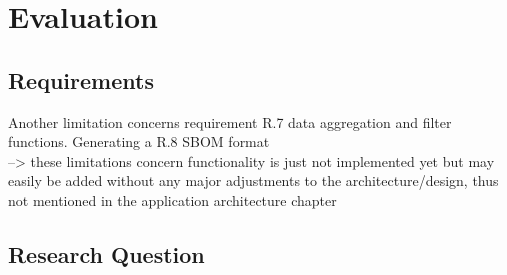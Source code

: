 

\section{Evaluation}
\subsection{Requirements}
Another limitation concerns requirement R.7 data aggregation and filter functions.
Generating a R.8 SBOM format\\
--> these limitations concern functionality is just not implemented yet but may easily be added without any major adjustments to the architecture/design, thus not mentioned in the application architecture chapter

\subsection{Research Question}



